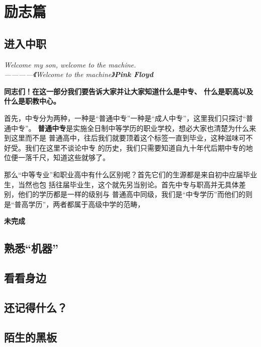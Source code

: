 \section{励志篇}

\subsection{进入中职}

\begin{center}
    \emph{Welcome my son, welcome to the machine.\\————《Welcome to the machine》\textbf{Pink Floyd}}
\end{center}

\textbf{同志们！在这一部分我们要告诉大家并让大家知道什么是中专、
什么是职高以及什么是职教中心。}

首先，中专分为两种，一种是“普通中专”一种是“成人中专”，这里我们只探讨“普通中专”。
\textbf{普通中专}是实施全日制中等学历的职业学校，想必大家也清楚为什么来到这里而不是
普通高中，往后我们就要顶着这个标签一直到毕业，这种滋味可不好受。我们在这里不谈论中专
的历史，我们只需要知道自九十年代后期中专的地位便一落千尺，知道这些就够了。

那么“中等专业”和职业高中有什么区别呢？首先它们的生源都是来自初中应届毕业生，当然也包
括往届毕业生，这个就先另当别论。首先中专与职高并无具体差别，他们的学历都是一样的级别与
普通高中同级，我们是“中专学历”而他们的则是“普高学历”，两者都属于高级中学的范畴，

\textbf{未完成}



\subsection{熟悉“机器”}

\subsection{看看身边}

\subsection{还记得什么？}

\subsection{陌生的黑板}



